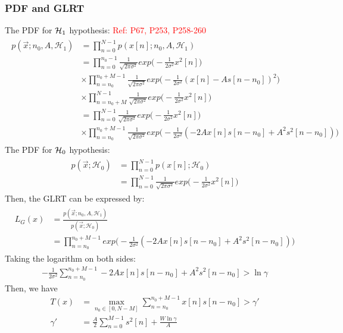 \subsubsection{PDF and GLRT}
The PDF for $\operatorname*{\mathcal{H}_1}$ hypothesis: \textcolor{red}{Ref: P67, P253,  P258-260}
\begin{align}
\begin{split}
p(\vec{x};n_0,A,\mathcal{H}_1)&=\prod_{n=0}^{N-1} p(x[n];n_0,A,\mathcal{H}_1)\\
&=\prod_{n=0}^{n_0-1}\frac{1}{\sqrt{2\pi\sigma^2}}exp\big(-\frac{1}{2\sigma^2}x^2[n]\big)\\
&\times \prod_{n=n_0}^{n_0+M-1}\frac{1}{\sqrt{2\pi\sigma^2}}exp\big(-\frac{1}{2\sigma^2}(x[n]-As[n-n_0])^2\big)\\
&\times \prod_{n=n_0+M}^{N-1}\frac{1}{\sqrt{2\pi\sigma^2}}exp\big(-\frac{1}{2\sigma^2}x^2[n]\big)\\
&=\prod_{n=0}^{N-1}\frac{1}{\sqrt{2\pi\sigma^2}}exp\big(-\frac{1}{2\sigma^2}x^2[n]\big)\\
&\times \prod_{n=n_0}^{n_0+M-1}\frac{1}{\sqrt{2\pi\sigma^2}}exp\big(-\frac{1}{2\sigma^2}(-2Ax[n]s[n-n_0]+A^2s^2[n-n_0])\big)
\end{split}
\end{align}
The PDF for $\operatorname*{\mathcal{H}_0}$ hypothesis:
\begin{align}
\begin{split}
p(\vec{x};\mathcal{H}_0)&=\prod_{n=0}^{N-1} p(x[n];\mathcal{H}_0)\\
&=\prod_{n=0}^{N-1}\frac{1}{\sqrt{2\pi\sigma^2}}exp\big(-\frac{1}{2\sigma^2}x^2[n]\big)
\end{split}
\end{align}
Then, the GLRT can be expressed by:
\begin{align}
\begin{split}
L_G(x)&=\frac{p(\vec{x};n_0,A,\mathcal{H}_1)}{p(\vec{x};\mathcal{H}_0)}\\
&=\prod_{n=n_0}^{n_0+M-1}exp\big(-\frac{1}{2\sigma^2}(-2Ax[n]s[n-n_0]+A^2s^2[n-n_0])\big)
\end{split}
\end{align}
Taking the logarithm on both sides: 
\begin{align}
-\frac{1}{2\sigma^2}\sum_{n=n_0}^{n_0+M-1}-2Ax[n]s[n-n_0]+A^2s^2[n-n_0]>\ln\gamma
\end{align}
Then, we have
\begin{align}\label{eq:MF_Tx_argmax}
T(x)&=\max_{n_0\in[0,N-M]}\sum_{n=n_0}^{n_0+M-1}x[n]s[n-n_0]>\gamma'\\
\gamma'&=\frac{A}{2}\sum_{n=0}^{M-1}s^2[n]+\frac{W\ln\gamma}{A}
\end{align}

